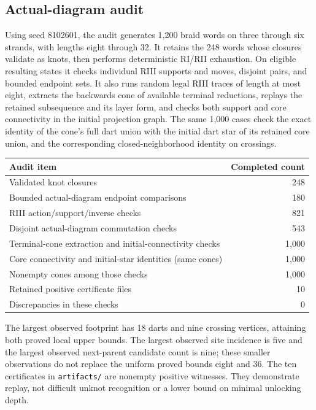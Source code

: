 \documentclass[11pt]{article}
\theoremstyle{definition}
\newcommand{\code}[1]{\texttt{#1}}
\begin{document}
\subsection{Actual-diagram audit}

Using seed 8102601, the audit generates 1,200 braid words on three through
six strands, with lengths eight through 32. It retains the 248 words
whose closures validate as knots, then performs deterministic RI/RII
exhaustion. On eligible resulting states it checks individual RIII
supports and moves, disjoint pairs, and bounded endpoint sets. It also
runs random legal RIII traces of length at most eight, extracts the
backwards cone of available terminal reductions, replays the retained
subsequence and its layer form, and checks both support and core connectivity in the initial
projection graph. The same 1,000 cases check the exact identity of the
cone's full dart union with the initial dart star of its retained core
union, and the corresponding closed-neighborhood identity on crossings.

\begin{center}
\begin{tabular}{lr}
\toprule
Audit item & Completed count\\
\midrule
Validated knot closures & 248\\
Bounded actual-diagram endpoint comparisons & 180\\
RIII action/support/inverse checks & 821\\
Disjoint actual-diagram commutation checks & 543\\
Terminal-cone extraction and initial-connectivity checks & 1,000\\
Core connectivity and initial-star identities (same cones) & 1,000\\
Nonempty cones among those checks & 1,000\\
Retained positive certificate files & 10\\
Discrepancies in these checks & 0\\
\bottomrule
\end{tabular}
\end{center}

The largest observed footprint has 18 darts and nine crossing vertices,
attaining both proved local upper bounds. The largest observed site
incidence is five and the largest observed next-parent candidate count
is nine; these smaller observations do not replace the uniform proved
bounds eight and 36. The ten certificates in \code{artifacts/} are
nonempty positive witnesses. They demonstrate replay, not difficult
unknot recognition or a lower bound on minimal unlocking depth.
\end{document}
